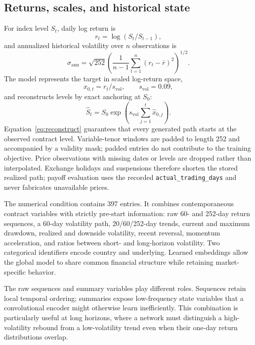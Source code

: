 ﻿\documentclass[12pt,letterpaper]{article}
\begin{document}
\subsection{Returns, scales, and historical state}

For index level $S_t$, daily log return is
\begin{equation}
r_t=\log(S_t/S_{t-1}),
\end{equation}
and annualized historical volatility over $n$ observations is
\begin{equation}
\sigma_{\mathrm{ann}}
=\sqrt{252}\left(\frac{1}{n-1}\sum_{t=1}^{n}(r_t-\bar r)^2\right)^{1/2}.
\end{equation}
The model represents the target in scaled log-return space,
\begin{equation}
x_{0,t}=r_t/s_{\mathrm{vol}}, \qquad s_{\mathrm{vol}}=0.09,
\end{equation}
and reconstructs levels by exact anchoring at $S_0$:
\begin{equation}
\widehat S_t=S_0\exp\left(s_{\mathrm{vol}}\sum_{j=1}^{t}\widehat x_{0,j}\right).
\label{eq:reconstruct}
\end{equation}
Equation~\eqref{eq:reconstruct} guarantees that every generated path starts at
the observed contract level. Variable-tenor windows are padded to length 252
and accompanied by a validity mask; padded entries do not contribute to the
training objective. Price observations with missing dates or levels are
dropped rather than interpolated. Exchange holidays and suspensions therefore
shorten the stored realized path; payoff evaluation uses the recorded
\texttt{actual\_trading\_days} and never fabricates unavailable prices.

The numerical condition contains 397 entries. It combines contemporaneous
contract variables with strictly pre-start information: raw 60- and 252-day
return sequences, a 60-day volatility path, 20/60/252-day trends, current and
maximum drawdown, realized and downside volatility, recent reversal,
momentum acceleration, and ratios between short- and long-horizon volatility.
Two categorical identifiers encode country and underlying. Learned embeddings
allow the global model to share common financial structure while retaining
market-specific behavior.

The raw sequences and summary variables play different roles. Sequences
retain local temporal ordering; summaries expose low-frequency state variables
that a convolutional encoder might otherwise learn inefficiently. This
combination is particularly useful at long horizons, where a network must
distinguish a high-volatility rebound from a low-volatility trend even when
their one-day return distributions overlap.
\end{document}
